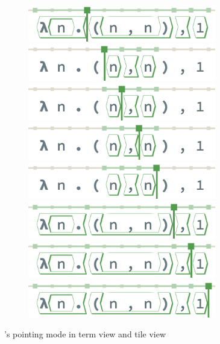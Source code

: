 \begin{figure}
\begin{subfigure}[c]{0.49\columnwidth}
    \includegraphics[width=0.9\textwidth]{img/pan-tiles-3.png}
    \includegraphics[width=0.9\textwidth]{img/pan-tiles-4.png}
    \includegraphics[width=0.9\textwidth]{img/pan-tiles-5.png}
    \includegraphics[width=0.9\textwidth]{img/pan-tiles-6.png}
    \includegraphics[width=0.9\textwidth]{img/pan-tiles-7.png}
    \includegraphics[width=0.9\textwidth]{img/pan-tiles-8.png}
    \includegraphics[width=0.9\textwidth]{img/pan-tiles-9.png}
    \includegraphics[width=0.9\textwidth]{img/pan-tiles-10.png}
    \caption{}
    \label{fig:pan-tile-view}
  \end{subfigure}
  \vspace{10pt}
  \caption{\tylr's pointing mode in \protect{} term view
  and \protect{} tile view }
  \label{fig:pan}
\end{figure}
